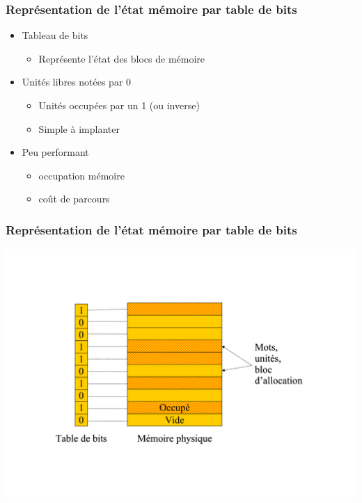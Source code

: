 \begin{frame}
\frametitle{Représentation de l'état mémoire par table de bits}
\begin{itemize}
\item Tableau de bits
\begin{itemize}
\item Représente l'état des blocs de mémoire
\end{itemize}
\item Unités libres notées par 0
\begin{itemize}
\item Unités occupées par un 1 (ou inverse)
\item Simple à implanter
\end{itemize}
\item Peu performant
\begin{itemize}
\item occupation mémoire
\item coût de parcours
\end{itemize}
\end{itemize}
\end{frame}


\begin{frame}
\frametitle{Représentation de l'état mémoire par table de bits}
\includegraphics[width=.9\textwidth]{../illustration/memoire_principale_table_bit.pdf}
\end{frame}


